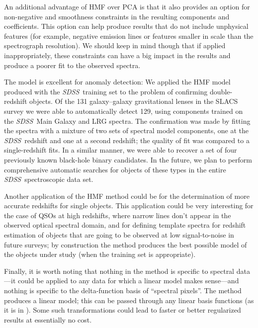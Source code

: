 \documentclass[12pt,preprint]{aastex}
\newcommand{\project}[1]{\textsl{#1}}
\newcommand{\sdss}{\project{SDSS}}
\newcommand{\SDSS}{\sdss}
\begin{document}
An additional advantage of HMF over PCA is that it
also provides an option for non-negative and smoothness constraints in
the resulting components and coefficients.  This option can help
produce results that do not include unphysical features (for example,
negative emission lines or features smaller in scale than the
spectrograph resolution). We should keep in mind though that if
applied inappropriately, these constraints can have a big impact in
the results and produce a poorer fit to the observed spectra.

The model is excellent for anomaly detection:  We applied the HMF
model produced with the \SDSS\ training set to the problem of
confirming double-redshift objects.  Of the 131 galaxy--galaxy
gravitational lenses in the SLACS survey we were able to automatically
detect 129, using components trained on the \SDSS\ Main Galaxy and LRG
spectra. The confirmation was made by fitting the spectra with a
mixture of two sets of spectral model components, one at the
\SDSS\ redshift and one at a second redshift; the quality of fit was
compared to a single-redshift fits.  In a similar manner, we were able
to recover a set of four previously known black-hole binary
candidates.  In the future, we plan to perform comprehensive automatic
searches for objects of these types in the entire \SDSS\ spectroscopic
data set.

Another application of the HMF method could be for the determination
of more accurate redshifts for single objects.  This application could
be very interesting for the case of QSOs at high redshifts, where
narrow lines don't appear in the observed optical spectral domain, and for
defining template spectra for redshift estimation of objects that are
going to be observed at low signal-to-noise in future surveys; by
construction the method produces the best possible model of the
objects under study (when the training set is appropriate).

Finally, it is worth noting that nothing in the method is specific to
spectral data---it could be applied to any data for which a linear
model makes sense---and nothing is specific to the delta-function
basis of ``spectral pixels''.  The method produces a linear model;
this can be passed through any linear basis functions (as it is
in \citealt{blanton}).  Some such
transformations could lead to faster or better regularized results at
essentially no cost.
\end{document}
